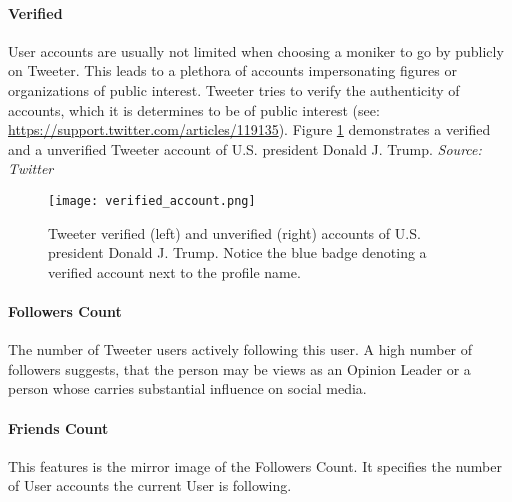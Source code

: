 			\paragraph{Verified}	
				User accounts are usually not limited when choosing a moniker to go by publicly on Tweeter. This leads to a plethora of accounts impersonating figures or organizations of public interest. Tweeter tries to verify the authenticity of accounts, which it is determines to be of public interest (see: \url{https://support.twitter.com/articles/119135}). Figure \ref{fig:verified_accounts} demonstrates a verified and a unverified Tweeter account of U.S. president Donald J. Trump. \textit{Source: Twitter}

				
				\begin{figure}[h]
					\centering
					\captionsetup{width=0.8\textwidth}
					\texttt{[image: verified\_account.png]}
					\caption[Tweeter Verified Accounts]{
						\footnotesize{
							Tweeter verified (left) and unverified (right) accounts of U.S. president Donald J. Trump. Notice the blue badge denoting a verified account next to the profile name.
						}
					} 
					\label{fig:verified_accounts}
				\end{figure}
			
			\paragraph{Followers Count}
				The number of Tweeter users actively following this user. A high number of followers suggests, that the person may be views as an Opinion Leader or a person whose carries substantial influence on social media.
				
			\paragraph{Friends Count}
				This features is the mirror image of the Followers Count. It specifies the number of User accounts the current User is following.
					
